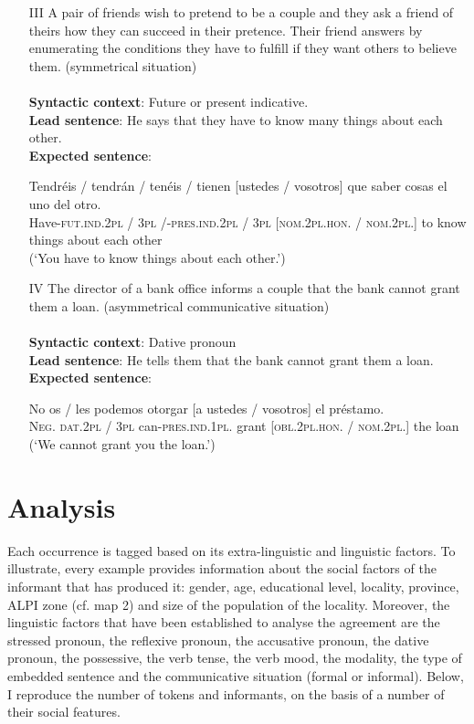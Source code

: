\documentclass[output=paper]{LSP/langsci}
\begin{document}
\begin{enumerate}
\item [III] A pair of friends wish to pretend to be a couple and they ask a friend of theirs how they can succeed in their pretence. Their friend answers by enumerating the conditions they have to fulfill if they want others to believe them. (symmetrical situation)\\
\\
\textbf{Syntactic context}: Future or present indicative.\\
\textbf{Lead sentence}: He says that they have to know many things about each other.\\ 
\textbf{Expected sentence}:

\ea
\gll
{Tendréis / tendrán / tenéis / tienen}                  {[ustedes / vosotros]} que saber cosas {el uno del otro}.\\
{Have-\textsc{fut.ind.2pl / 3pl /-pres.ind.2pl / 3pl}}   {\textsc{[nom.2pl.hon. / nom.2pl.]}} to know things {about each other}\\
\glt (`You have to know things about each other.')\\
\z
 
\item [IV] The director of a bank office informs a couple that the bank cannot grant them a loan. (asymmetrical communicative situation)\\
\\
\textbf{Syntactic context}: Dative pronoun\\
\textbf{Lead sentence}: He tells them that the bank cannot grant them a loan. \\
\textbf{Expected sentence}:

\ea
\gll
No    {os / les}            podemos                otorgar {[a ustedes / vosotros]} el préstamo.\\
{\textsc{Neg.}} {\textsc{dat.2pl / 3pl}} {can-\textsc{pres.ind.1pl.}}  {grant}    {\textsc{[obl.2pl.hon. / nom.2pl.]}} the loan\\
\glt (`We cannot grant you the loan.')
\z

\end{enumerate}

\section{Analysis}
Each occurrence is tagged based on its extra-linguistic and linguistic factors. To illustrate, every example provides information about the social factors of the informant that has produced it: gender, age, educational level, locality, province, ALPI zone (cf. map 2) and size of the population of the locality. Moreover, the linguistic factors that have been established to analyse the agreement are the stressed pronoun, the reflexive pronoun, the accusative pronoun, the dative pronoun, the possessive, the verb tense, the verb mood, the modality, the type of embedded sentence and the communicative situation (formal or informal). Below, I reproduce the number of tokens and informants, on the basis of a number of their social features.
\end{document}
